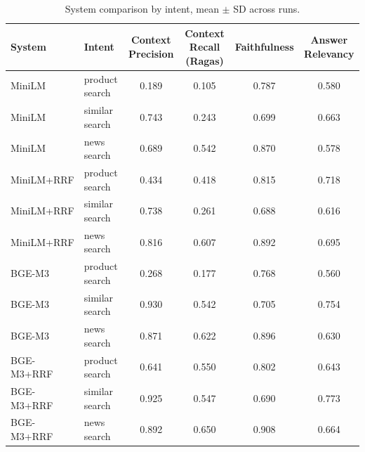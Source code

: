 \begin{table}[t]
\centering
\caption{System comparison by intent, mean $\pm$ SD across runs.}
\label{tab:systems-intent}
\begin{tabular}{llcccc}
\toprule
System & Intent & Context Precision & Context Recall (Ragas) & Faithfulness & Answer Relevancy \\
\midrule
MiniLM & product search & 0.189 & 0.105 & 0.787 & 0.580 \\
MiniLM & similar search & 0.743 & 0.243 & 0.699 & 0.663 \\
MiniLM & news search & 0.689 & 0.542 & 0.870 & 0.578 \\
MiniLM+RRF & product search & 0.434 & 0.418 & 0.815 & 0.718 \\
MiniLM+RRF & similar search & 0.738 & 0.261 & 0.688 & 0.616 \\
MiniLM+RRF & news search & 0.816 & 0.607 & 0.892 & 0.695 \\
BGE-M3 & product search & 0.268 & 0.177 & 0.768 & 0.560 \\
BGE-M3 & similar search & 0.930 & 0.542 & 0.705 & 0.754 \\
BGE-M3 & news search & 0.871 & 0.622 & 0.896 & 0.630 \\
BGE-M3+RRF & product search & 0.641 & 0.550 & 0.802 & 0.643 \\
BGE-M3+RRF & similar search & 0.925 & 0.547 & 0.690 & 0.773 \\
BGE-M3+RRF & news search & 0.892 & 0.650 & 0.908 & 0.664 \\
\bottomrule
\end{tabular}
\end{table}